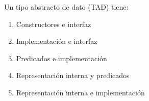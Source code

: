 {
Un tipo abstracto de dato (TAD) tiene:
	\begin{enumerate}
		\item Constructores e interfaz
		\item Implementación e interfaz %
		\item Predicados e implementación
		\item Representación interna y predicados
		\item Representación interna e implementación
	\end{enumerate}
}
